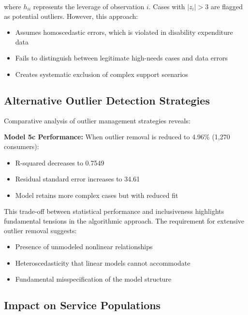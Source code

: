 where $h_{ii}$ represents the leverage of observation $i$. Cases with $|z_i| > 3$ are flagged as potential outliers. However, this approach:
\begin{itemize}
    \item Assumes homoscedastic errors, which is violated in disability expenditure data
    \item Fails to distinguish between legitimate high-needs cases and data errors
    \item Creates systematic exclusion of complex support scenarios
\end{itemize}

\subsection{Alternative Outlier Detection Strategies}

Comparative analysis of outlier management strategies reveals:

\textbf{Model 5c Performance:} When outlier removal is reduced to 4.96\% (1,270 consumers):
\begin{itemize}
    \item R-squared decreases to 0.7549
    \item Residual standard error increases to 34.61
    \item Model retains more complex cases but with reduced fit
\end{itemize}

This trade-off between statistical performance and inclusiveness highlights fundamental tensions in the algorithmic approach. The requirement for extensive outlier removal suggests:
\begin{itemize}
    \item Presence of unmodeled nonlinear relationships
    \item Heteroscedasticity that linear models cannot accommodate
    \item Fundamental misspecification of the model structure
\end{itemize}

\subsection{Impact on Service Populations}

